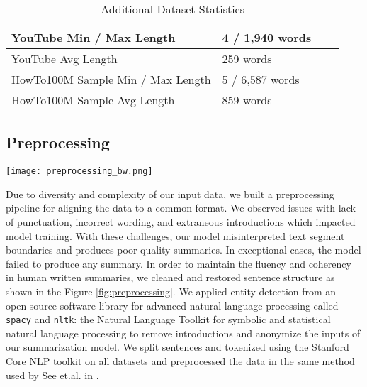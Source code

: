 \documentclass[sigconf]{acmart}
\begin{document}
\begin{table}
  \caption{Additional Dataset Statistics}
  \label{tab:datasets2}
  \centering
  \begin{tabular}{llll}
  \toprule
   YouTube Min / Max Length  &  4 / 1,940 words     \\
\midrule
YouTube Avg Length & 259 words    \\
\midrule
  HowTo100M Sample Min / Max Length & 5 / 6,587 words    \\
\midrule
HowTo100M Sample Avg Length & 859 words   \\
\bottomrule
  \end{tabular}
\end{table}

\subsection{Preprocessing}
\label{Preprocessing}

\begin{figure*}
\centering
  \texttt{[image: preprocessing\_bw.png]}
  \caption{A pipeline for preprocessing of texts for summarization.}
  \label{fig:preprocessing}
\end{figure*}

Due to diversity and complexity of our input data, we built a preprocessing pipeline for aligning the data to a common format. We observed issues with lack of punctuation, incorrect wording, and extraneous introductions which impacted model training. With these challenges, our model misinterpreted text segment boundaries and produces poor quality summaries. In exceptional cases, the model failed to produce any summary. In order to maintain the fluency and coherency in human written summaries, we cleaned and restored sentence structure as shown in the Figure  \ref{fig:preprocessing}. We applied  entity detection from an open-source software library for advanced natural language processing called  \verb+spacy+ \cite{spacy2} and \verb+nltk+: the Natural Language Toolkit for symbolic and statistical natural language processing \cite{journals/corr/cs-CL-0205028} to remove introductions and anonymize the inputs of our summarization model. We split sentences and tokenized using the Stanford Core NLP toolkit on all datasets and preprocessed the data in the same method used by See et.al. in  \cite{DBLP:journals/corr/SeeLM17}.  
\end{document}
